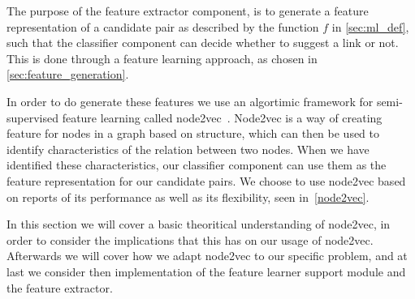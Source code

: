 The purpose of the feature extractor component, is to generate a feature representation of a candidate pair as described by the function $f$ in \cref{sec:ml_def}, such that the classifier component can decide whether to suggest a link or not. This is done through a feature learning approach, as chosen in \cref{sec:feature_generation}.

In order to do generate these features we use an algortimic framework for semi-supervised feature learning called node2vec~\cite{node2vec}. Node2vec is a way of creating feature for nodes in a graph based on structure, which can then be used to identify characteristics of the relation between two nodes. When we have identified these characteristics, our classifier component can use them as the feature representation for our candidate pairs. We choose to use node2vec based on reports of its performance as well as its flexibility, seen in~\cref{node2vec}.

In this section we will cover a basic theoritical understanding of node2vec, in order to consider the implications that this has on our usage of node2vec. Afterwards we will cover how we adapt node2vec to our specific problem, and at last we consider then implementation of the feature learner support module and the feature extractor.







